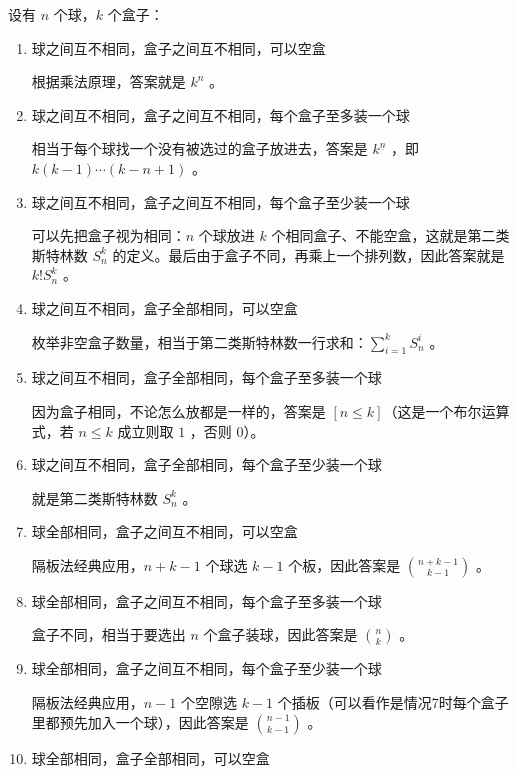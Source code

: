\documentclass{article}
\begin{document}
设有 $n$ 个球，$k$ 个盒子：

\begin{enumerate}
    \item 球之间互不相同，盒子之间互不相同，可以空盒

   根据乘法原理，答案就是 $k^n$ 。

    \item 球之间互不相同，盒子之间互不相同，每个盒子至多装一个球

   相当于每个球找一个没有被选过的盒子放进去，答案是 $k^{\underline{n}}$ ，即 $k(k-1)\cdots(k-n+1)$ 。

    \item 球之间互不相同，盒子之间互不相同，每个盒子至少装一个球

   可以先把盒子视为相同：$n$ 个球放进 $k$ 个相同盒子、不能空盒，这就是第二类斯特林数 $S^k_n$ 的定义。最后由于盒子不同，再乘上一个排列数，因此答案就是 $k!S^k_n$ 。

    \item 球之间互不相同，盒子全部相同，可以空盒

   枚举非空盒子数量，相当于第二类斯特林数一行求和：$\sum_{i=1}^{k}S^i_n$ 。

    \item 球之间互不相同，盒子全部相同，每个盒子至多装一个球

   因为盒子相同，不论怎么放都是一样的，答案是 $[n\leq k]$（这是一个布尔运算式，若 $n\leq k$ 成立则取 $1$ ，否则 $0$）。

    \item 球之间互不相同，盒子全部相同，每个盒子至少装一个球

   就是第二类斯特林数 $S_n^k$ 。

    \item 球全部相同，盒子之间互不相同，可以空盒

   隔板法经典应用，$n+k-1$ 个球选 $k-1$ 个板，因此答案是 $\binom{n+k-1}{k-1}$ 。

    \item 球全部相同，盒子之间互不相同，每个盒子至多装一个球

   盒子不同，相当于要选出 $n$ 个盒子装球，因此答案是 $\binom{n}{k}$ 。

    \item 球全部相同，盒子之间互不相同，每个盒子至少装一个球

   隔板法经典应用，$n-1$ 个空隙选 $k-1$ 个插板（可以看作是情况7时每个盒子里都预先加入一个球），因此答案是 $\binom{n-1}{k-1}$ 。

    \item 球全部相同，盒子全部相同，可以空盒


\end{enumerate}
\end{document}
